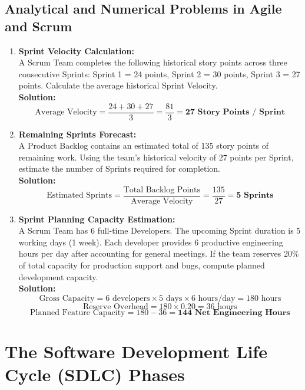 \subsection{Analytical and Numerical Problems in Agile and Scrum}
\begin{enumerate}[label=\textbf{Problem \arabic*.},leftmargin=1.5cm]
\item \textbf{Sprint Velocity Calculation:} \\
A Scrum Team completes the following historical story points across three consecutive Sprints: Sprint 1 = 24 points, Sprint 2 = 30 points, Sprint 3 = 27 points. Calculate the average historical Sprint Velocity. \\
\textbf{Solution:}
\[
\text{Average Velocity} = \frac{24 + 30 + 27}{3} = \frac{81}{3} = \mathbf{27\text{ Story Points / Sprint}}
\]

\item \textbf{Remaining Sprints Forecast:} \\
A Product Backlog contains an estimated total of 135 story points of remaining work. Using the team's historical velocity of 27 points per Sprint, estimate the number of Sprints required for completion. \\
\textbf{Solution:}
\[
\text{Estimated Sprints} = \frac{\text{Total Backlog Points}}{\text{Average Velocity}} = \frac{135}{27} = \mathbf{5\text{ Sprints}}
\]

\item \textbf{Sprint Planning Capacity Estimation:} \\
A Scrum Team has 6 full-time Developers. The upcoming Sprint duration is 5 working days (1 week). Each developer provides 6 productive engineering hours per day after accounting for general meetings. If the team reserves 20\% of total capacity for production support and bugs, compute planned development capacity. \\
\textbf{Solution:}
\[
\text{Gross Capacity} = 6\text{ developers} \times 5\text{ days} \times 6\text{ hours/day} = 180\text{ hours}
\]
\[
\text{Reserve Overhead} = 180 \times 0.20 = 36\text{ hours}
\]
\[
\text{Planned Feature Capacity} = 180 - 36 = \mathbf{144\text{ Net Engineering Hours}}
\]
\end{enumerate}

\section{The Software Development Life Cycle (SDLC) Phases}
\label{sec:se_sdlc_phases}

